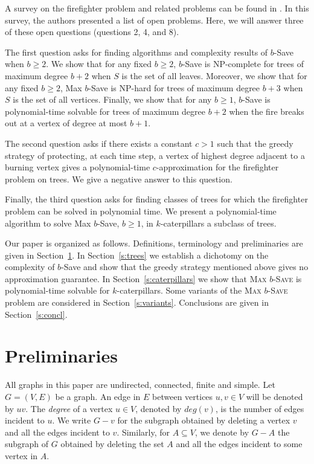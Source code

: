 \documentclass[10pt]{article}
\begin{document}
A survey on the firefighter problem and related problems can
be found in \cite{finbow2009}. In this survey, the authors presented a list of
open problems. Here, we will answer three of these open questions (questions 2, 4, and 8).

The first question asks for finding algorithms and complexity results of {\sc $b$-Save}
when $b\geq 2$. We show that for any fixed $b\geq 2$, {\sc
$b$-Save} is NP-complete for trees of maximum degree $b+2$ when $S$ is the set of all leaves. Moreover, we show that for any fixed $b \geq 2$,
{\sc Max $b$-Save} is NP-hard for trees of maximum degree $b+3$ when $S$ is the set of all vertices.
Finally, we show that for any $b \geq 1$, {\sc $b$-Save} is polynomial-time solvable for trees of
maximum degree $b+2$ when the fire breaks out at a vertex of degree at most $b+1$.

The second question asks if there exists a constant $c > 1$ such that the greedy strategy of protecting, at each time step, a vertex of highest degree adjacent to a burning vertex gives a polynomial-time $c$-approximation for the firefighter problem on trees. We give a negative answer to this question.

Finally, the third question asks for finding classes of trees for which the firefighter problem can be solved in
polynomial time. We present a polynomial-time algorithm to solve {\sc Max $b$-Save}, $b \geq 1$, in $k$-caterpillars a subclass of trees.



Our paper is organized as follows.
Definitions, terminology and preliminaries are given in  Section~\ref{s:prelim}.
In Section~\ref{s:trees} we establish a dichotomy on the complexity of {\sc $b$-Save} and show that the greedy strategy mentioned above gives no approximation guarantee. In Section~\ref{s:caterpillars} we  show that \textsc{Max $b$-Save} is polynomial-time solvable for
$k$-caterpillars. Some variants of the \textsc{Max $b$-Save} problem are considered in Section~\ref{s:variants}. Conclusions are given in Section~\ref{s:concl}.


\section{Preliminaries} \label{s:prelim}


All graphs in this paper are undirected, connected, finite and simple. Let $G=(V,E)$ be a graph. An edge in $E$ between vertices $u,v\in V$ will be denoted by $uv$. The \textit{degree} of a vertex $u\in V$, denoted by $deg(v)$, is the number of edges incident to $u$.
We write $G-v$ for the subgraph obtained by deleting a vertex $v$ and all the edges incident to $v$. Similarly, for $A\subseteq V$, we denote by $G-A$ the subgraph of $G$ obtained by deleting the set $A$ and all the edges incident to some vertex in $A$.
\end{document}
